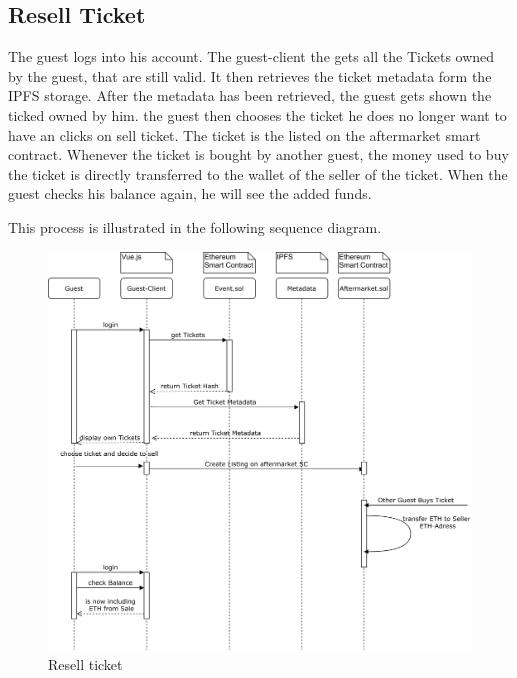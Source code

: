 \subsection{Resell Ticket}
The guest logs into his account. The guest-client the gets all the Tickets owned by the guest, that are still valid. It then retrieves the ticket metadata form the IPFS storage. After the metadata has been retrieved, the guest gets shown the ticked owned by him. the guest then chooses the ticket he does no longer want to have an clicks on sell ticket. The ticket is the listed on the aftermarket smart contract. Whenever the ticket is bought by another guest, the money used to buy the ticket is directly transferred to the wallet of the seller of the ticket. When the guest checks his balance again, he will see the added funds.

This process is illustrated in the following sequence diagram.

\begin{figure}[H]
    \centering
    \includegraphics[width=16cm]{design/diagrams/Resell Ticket.png}
    \caption{Resell ticket}
    \label{fig:Resell-ticket}
\end{figure}

 


